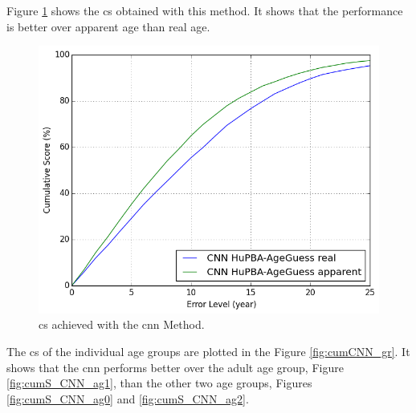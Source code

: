 Figure \ref{fig:cumS_CNN} shows the \gls{cs} obtained with this method. It shows that the performance is better over apparent age than real age.

\begin{figure}[!h]
	\centering
	\includegraphics[width=\textwidth]{figures/results_cnn_cum_score_good}
	\caption{\acrshort{cs} achieved with the \acrshort{cnn} Method.}
	\label{fig:cumS_CNN}
\end{figure}

The \gls{cs} of the individual age groups are plotted in the Figure \ref{fig:cumCNN_gr}. It shows that the \gls{cnn} performs better over the adult age group, Figure \ref{fig:cumS_CNN_ag1}, than the other two age groups, Figures \ref{fig:cumS_CNN_ag0} and \ref{fig:cumS_CNN_ag2}.

